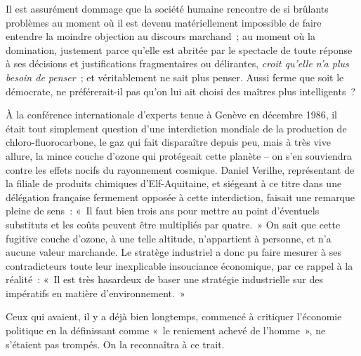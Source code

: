 \documentclass[french,twoside]{book} %
\def\mednobreak{\ifdim\lastskip<\medskipamount
  \removelastskip\nopagebreak\medskip\fi}
\newcommand{\labelblock}[1]{\medbreak{\noindent\color{rubric}\bfseries #1}\par\mednobreak}
\begin{document}
Il est assurément dommage que la société humaine rencontre de si brûlants problèmes au moment où il est devenu matériellement impossible de faire entendre la moindre objection au discours marchand ; au moment où la domination, justement parce qu’elle est abritée par le spectacle de toute réponse à ses décisions et justifications fragmentaires ou délirantes, \emph{croit qu’elle n’a plus besoin de penser} ; et véritablement ne sait plus penser. Aussi ferme que soit le démocrate, ne préférerait-il pas qu’on lui ait choisi des maîtres plus intelligents ?\par
À la conférence internationale d’experts tenue à Genève en décembre 1986, il était tout simplement question d’une interdiction mondiale de la production de chloro-fluorocarbone, le gaz qui fait disparaître depuis peu, mais à très vive allure, la mince couche d’ozone qui protégeait cette planète – on s’en souviendra contre les effets nocifs du rayonnement cosmique. Daniel Verilhe, représentant de la filiale de produits chimiques d’Elf-Aquitaine, et siégeant à ce titre dans une délégation française fermement opposée à cette interdiction, faisait une remarque pleine de sens : « Il faut bien trois ans pour mettre au point d’éventuels substituts et les coûts peuvent être multipliés par quatre. » On sait que cette fugitive couche d’ozone, à une telle altitude, n’appartient à personne, et n’a aucune valeur marchande. Le stratège industriel a donc pu faire mesurer à ses contradicteurs toute leur inexplicable insouciance économique, par ce rappel à la réalité : « Il est très hasardeux de baser une stratégie industrielle sur des impératifs en matière d’environnement. »\par
Ceux qui avaient, il y a déjà bien longtemps, commencé à critiquer l’économie politique en la définissant comme « le reniement achevé de l’homme », ne s’étaient pas trompés. On la reconnaîtra à ce trait.\par

\labelblock{XIV}
\end{document}
